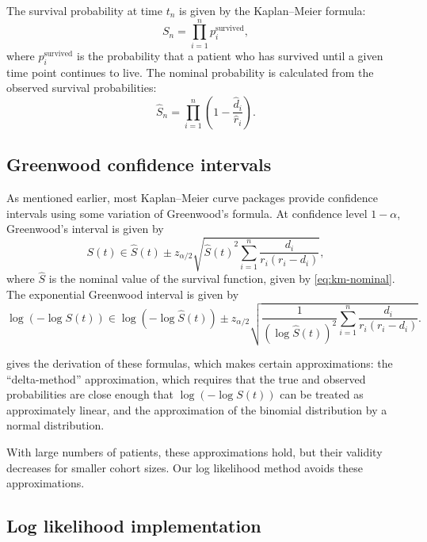 \documentclass[article]{jss}
\newcommand{\KM}{Kaplan--Meier} %
\begin{document}
The survival probability at time \(t_n\) is given by the \KM{} formula:
\begin{equation}
S_n = \prod_{i=1}^{n} p_i^\text{survived}, \label{eq:km-survival}
\end{equation}
where \(p_i^\text{survived}\) is the probability that a patient who has survived until a given time point continues to live. The nominal probability is calculated from the observed survival probabilities:
\begin{equation}
\hat{S}_n = \prod_{i=1}^{n} \left(1 - \frac{\hat{d}_i}{\hat{r}_i}\right). \label{eq:km-nominal}
\end{equation}

\subsection{Greenwood confidence intervals}\label{sec:greenwood}

As mentioned earlier, most \KM{} curve packages provide confidence intervals using some variation of Greenwood's formula.  At confidence level \(1-\alpha\), Greenwood's interval is given by
\begin{equation}
\label{eq:greenwood}
S(t)\in\hat{S}(t) \pm z_{\alpha/2} \sqrt{{\hat{S}(t)}^2{\sum_{i=1}^{n} \frac{d_i}{r_i(r_i-d_i)}}},
\end{equation}
where \(\hat{S}\) is the nominal value of the survival function, given by \cref{eq:km-nominal}.  The exponential Greenwood interval is given by
\begin{equation}
\label{eq:exponential-greenwood}
\log{\left(-\log S(t)\right)} \in \log{\left(-\log \hat{S}(t)\right)} \pm z_{\alpha/2} \sqrt{\frac{1}{{\left(\log \hat{S}(t)\right)}^2} \sum_{i=1}^{n} \frac{d_i}{r_i(r_i-d_i)}}.
\end{equation}

\citet{GreenwoodNotes} gives the derivation of these formulas, which makes certain approximations: the ``delta-method'' approximation, which requires that the true and observed probabilities are close enough that \(\log\left(-\log S(t)\right)\) can be treated as approximately linear, and the approximation of the binomial distribution by a normal distribution.

With large numbers of patients, these approximations hold, but their validity decreases for smaller cohort sizes.  Our log likelihood method avoids these approximations.

\subsection{Log likelihood implementation}
\end{document}
